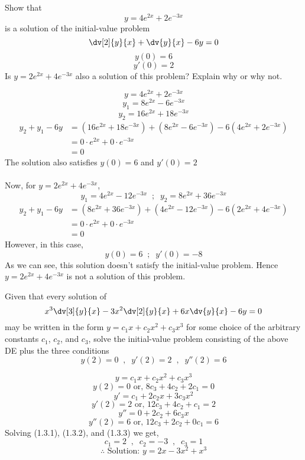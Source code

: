 \begin{example}{
        Show that \[
            y = 4e^{2x} + 2e^{-3x}
        \] is a solution of the initial-value problem \[
        \dv[2]{y}{x} + \dv{y}{x} - 6y = 0
        \] \[ y(0) = 6 \]
        \[ y'(0) = 2 \]
        Is $y=2e^{2x} + 4e^{-3x}$ also a solution of this problem? Explain why or why not.
    }
    
    \[ y = 4e^{2x} + 2e^{-3x} \]
    \[ y_1 = 8e^{2x} - 6e^{-3x} \]
    \[ y_2 = 16e^{2x} + 18e^{-3x} \]
    \begin{align*}
        y_2 + y_1 - 6y &= (16e^{2x} + 18e^{-3x}) + (8e^{2x} - 6e^{-3x}) - 6(4e^{2x} + 2e^{-3x}) \\
        &= 0\cdot e^{2x} + 0\cdot e^{-3x} \\
        &= 0
    \end{align*}
    The solution also satisfies $y(0)=6$ and  $y'(0)=2$ \\~\\

    Now,
    for $y = 2e^{2x} + 4e^{-3x}$,
    \[ y_1 = 4e^{2x} - 12e^{-3x} \;\;;\;\; y_2 = 8e^{2x} + 36e^{-3x} \]
    \begin{align*}
        y_2 + y_1 - 6y &= (8e^{2x} + 36e^{-3x}) + (4e^{2x} - 12e^{-3x}) - 6(2e^{2x} + 4e^{-3x}) \\
        &= 0\cdot e^{2x} + 0\cdot e^{-3x} \\
        &= 0
    \end{align*}
    However, in this case,
    \[ y(0) = 6 \;\;;\;\; y'(0) = -8 \]
    As we can see, this solution doesn't satisfy the initial-value problem. Hence $y=2e^{2x} + 4e^{-3x}$ is not a solution of this problem.
\end{example}

\begin{example}{
        Given that every solution of \[
            x^3 \dv[3]{y}{x} - 3x^2 \dv[2]{y}{x} + 6x \dv{y}{x} - 6y = 0
        \] may be written in the form $y = c_1x + c_2x^2 + c_3x^3$ for some choice of the arbitrary constants $c_1$, $c_2$, and $c_3$, solve the initial-value problem consisting of the above DE plus the three conditions \\
        \[ y(2)=0 \;\;,\;\; y'(2)=2 \;\;,\;\; y''(2)=6 \]
    }
    
    \[ y = c_1x + c_2x^2 + c_3x^3 \]
    \begin{equation}
        y(2) = 0 \text{ or, } 8c_3 + 4c_2 + 2c_1 = 0
    \end{equation}
    \[ y' = c_1 + 2c_2x + 3c_3x^2 \]
    \begin{equation}
        y'(2) = 2 \text{ or, } 12c_3 + 4c_2 + c_1 = 2
    \end{equation}
    \[ y'' = 0 + 2c_2 + 6c_3x \]
    \begin{equation}
        y''(2) = 6 \text{ or, } 12c_3 + 2c_2 + 0c_1 = 6
    \end{equation}
    Solving (1.3.1), (1.3.2), and (1.3.3) we get,
    \[ c_1 = 2 \;\;,\;\; c_2 = -3 \;\;,\;\; c_3 = 1 \]
    \[ \therefore \text{ Solution: } y = 2x - 3x^2 + x^3 \]
\end{example}
